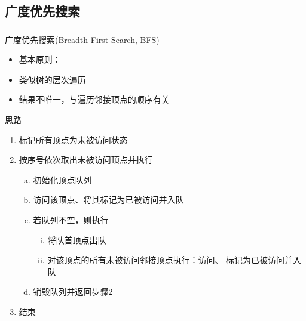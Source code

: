 \subsection{广度优先搜索}

\begin{frame}
    \frametitle{\insertsubsectionhead}
    \begin{block}{广度优先搜索(Breadth-First Search, BFS)}
        \begin{itemize}
            \item 基本原则：
            \item 类似树的层次遍历
            \item 结果不唯一，与遍历邻接顶点的顺序有关
        \end{itemize}
    \end{block}
    \begin{alertblock}{思路}
        \begin{enumerate}
            \item 标记所有顶点为\alert{未被访问}状态
            \item 按序号依次取出\alert{未被访问}顶点并执行
                  \begin{enumerate}[a.]
                      \item 初始化顶点队列
                      \item 访问该顶点、将其标记为\alert{已被访问}并入队
                      \item 若队列不空，则执行
                            \begin{enumerate}[i.]
                                \item 将队首顶点出队
                                \item 对该顶点的所有未被访问邻接顶点执行：访问、
                                      标记为\alert{已被访问}并入队
                            \end{enumerate}
                      \item 销毁队列并返回步骤2
                  \end{enumerate}
            \item 结束
        \end{enumerate}
    \end{alertblock}
\end{frame}

